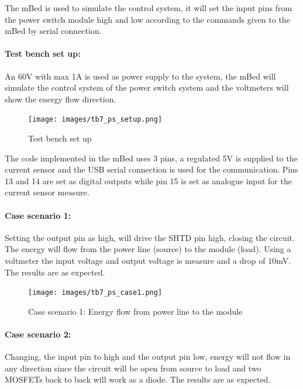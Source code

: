 The mBed is used to simulate the control system, it will set the input pins from the power switch module high and low according to the commands given to the mBed by serial connection.

\paragraph{Test bench set up:} An 60V with max 1A is used as power supply to the system, the mBed will simulate the control system of the power switch system and the voltmeters will show the energy flow direction.
\begin{figure}[H]
	\begin{centering}
		\texttt{[image: images/tb7\_ps\_setup.png]}
		\caption{Test bench set up}
	\end{centering}
\end{figure}

The code implemented in the mBed uses 3 pins, a regulated 5V is supplied to the current sensor and the USB serial connection is used for the communication. Pins 13 and 14 are set as digital outputs while pin 15 is set as analogue input for the current sensor measure.

\paragraph{Case scenario 1:} Setting the output pin as high, will drive the SHTD pin high, closing the circuit. The energy will flow from the power line (source) to the module (load). Using a voltmeter the input voltage and output voltage is measure and a drop of 10mV. The results are as expected.

\begin{figure}[H]
	\begin{centering}
		\texttt{[image: images/tb7\_ps\_case1.png]}
		\caption{Case scenario 1: Energy flow from power line to the module}
	\end{centering}
\end{figure}


\paragraph{Case scenario 2:}Changing, the input pin to high and the output pin low, energy will not flow in any direction since the circuit will be open from source to load and two MOSFETs back to back will work as a diode. The results are as expected.

